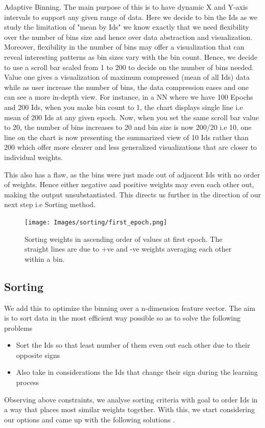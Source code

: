 \documentclass[journal]{vgtc}                %
\begin{document}
Adaptive Binning\cite{binning}. The main purpose of this is to have dynamic X and Y-axis intervals to support any given range of data.
Here we decide to bin the Ids as we study the limitation of "mean by Ids" we know exactly that we need flexibility over the number of bins size and hence over data abstraction and visualization. 
Moreover, flexibility in the number of bins may offer a visualization that can reveal interesting patterns as bin sizes vary with the bin count.
Hence, we decide to use a scroll bar scaled from 1 to 200  to decide on the number of bins needed. Value one gives a visualization of maximum compressed (mean of all Ids) data while as user increase the number of bins, the data compression eases and one can see a more in-depth view. For instance, in a NN where we have 100 Epochs and 200 Ids, when you make bin count to 1, the chart displays single line i.e mean of 200 Ids at any given epoch. Now, when you set the same scroll bar value to 20, the number of bins increases to 20 and bin size is now 200/20 i.e 10, one line on the chart is now presenting the summarized view of 10 Ids rather than 200 which offer more clearer and less generalized visualizations that are closer to individual weights.

This also has a flaw, as the bins were just made out of adjacent Ids with no order of weights. Hence either negative and positive weights may even each other out, making the output unsubstantiated. This directs us further in the direction of our next step i.e Sorting method.


\begin{figure}
    \texttt{[image: Images/sorting/first\_epoch.png]}
    \caption{Sorting weights in ascending order of values at first epoch. The straight lines are due to +ve and -ve weights averaging each other within a bin.}
    \label{fig:sort_first_epoch}
\end{figure}
\subsection{Sorting}We add this to optimize the binning over a n-dimension feature vector. The aim is to sort data in the most efficient way possible so as to solve the  following problems \cite{pca}
\begin{itemize}
    \item Sort the Ids so that least number of them even out each other due to their opposite signs
    \item Also take in considerations the Ids that change their sign during the learning process
\end{itemize}
Observing above constraints, we analyse sorting criteria with goal to  order Ids in a way that places most similar weights together.
With this, we start considering our options and came up with the following solutions \cite{sortingoptimal}.
\end{document}
